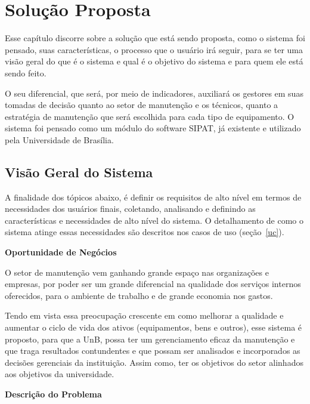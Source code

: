 \chapter{Solução Proposta}

Esse capítulo discorre sobre a solução que está sendo proposta, como o sistema foi pensado, suas características, o processo que o usuário irá seguir, para se ter uma visão geral do que é o sistema e qual é o objetivo do sistema e para quem ele está sendo feito. 

O seu diferencial, que será, por meio de indicadores, auxiliará os gestores em suas tomadas de decisão quanto ao setor de manutenção e os técnicos, quanto a estratégia de manutenção que será escolhida para cada tipo de equipamento. O sistema foi pensado como um módulo do software SIPAT, já existente e utilizado pela Universidade de Brasília.


\section{Visão Geral do Sistema}

A finalidade dos tópicos abaixo, é definir os requisitos de alto nível em termos de necessidades dos usuários finais, coletando, analisando e definindo as características e necessidades de alto nível do sistema. O detalhamento de como o sistema atinge essas necessidades são descritos nos casos de uso (seção~\ref{uc}).


\textbf{Oportunidade de Negócios}

O setor de manutenção vem ganhando grande espaço nas organizações e empresas, por poder ser um grande diferencial na qualidade dos serviços internos oferecidos, para o ambiente de trabalho e de grande economia nos gastos. 

Tendo em vista essa preocupação crescente em como melhorar a qualidade e aumentar o ciclo de vida dos ativos (equipamentos, bens e outros), esse sistema é proposto, para que a UnB, possa ter um gerenciamento eficaz da manutenção e que traga resultados contundentes e que possam ser analisados e incorporados as decisões gerenciais da instituição. Assim como, ter os objetivos do setor alinhados aos objetivos da universidade.

\pagebreak

\textbf{Descrição do Problema}

